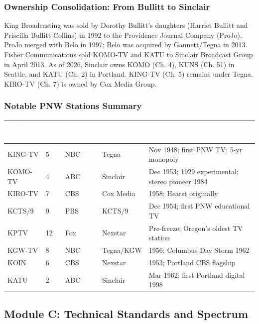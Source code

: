 \documentclass[11pt,letterpaper]{article}
\newcommand{\tableheader}[1]{\textbf{\sffamily\textcolor{white}{#1}}}
\begin{document}
\subsubsection{Ownership Consolidation: From Bullitt to Sinclair}

King Broadcasting was sold by Dorothy Bullitt's daughters (Harriet Bullitt and Priscilla Bullitt Collins) in 1992 to the Providence Journal Company (ProJo). ProJo merged with Belo in 1997; Belo was acquired by Gannett/Tegna in 2013. Fisher Communications sold KOMO-TV and KATU to Sinclair Broadcast Group in April 2013. As of 2026, Sinclair owns KOMO (Ch. 4), KUNS (Ch. 51) in Seattle, and KATU (Ch. 2) in Portland. KING-TV (Ch. 5) remains under Tegna. KIRO-TV (Ch. 7) is owned by Cox Media Group.

\subsubsection{Notable PNW Stations Summary}

\begin{center}
\begin{tabularx}{\textwidth}{L{2cm}L{1.5cm}L{2.5cm}L{2.5cm}X}
\toprule
{}
\tableheader{Call Sign} & \tableheader{Ch.} & \tableheader{Network} & \tableheader{Owner} & \tableheader{Founded / Notable} \\
\midrule
KING-TV & 5 & NBC & Tegna & Nov 1948; first PNW TV; 5-yr monopoly \\
KOMO-TV & 4 & ABC & Sinclair & Dec 1953; 1929 experimental; stereo pioneer 1984 \\
KIRO-TV & 7 & CBS & Cox Media & 1958; Hearst originally \\
KCTS/9 & 9 & PBS & KCTS/9 & Dec 1954; first PNW educational TV \\
KPTV & 12 & Fox & Nexstar & Pre-freeze; Oregon's oldest TV station \\
KGW-TV & 8 & NBC & Tegna/KGW & 1956; Columbus Day Storm 1962 \\
KOIN & 6 & CBS & Nexstar & 1953; Portland CBS flagship \\
KATU & 2 & ABC & Sinclair & Mar 1962; first Portland digital 1998 \\
\bottomrule
\end{tabularx}
\end{center}

\subsection{Module C: Technical Standards and Spectrum}
\end{document}
